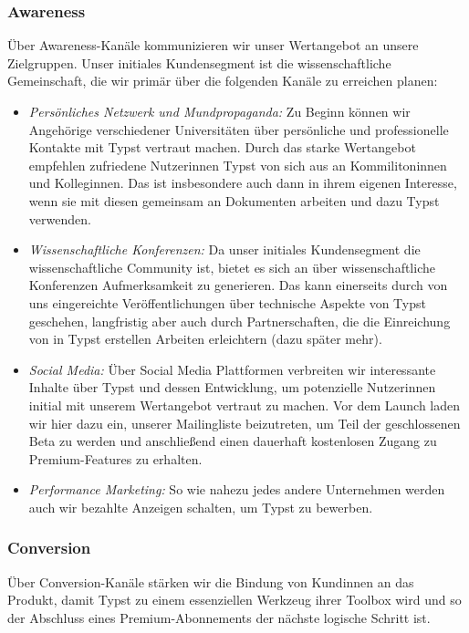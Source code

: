\documentclass[11pt, a4paper]{article}
\newcommand{\gender}{\raisebox{-.25em}{*}}
\renewcommand{\glossary} {\marginsymbol{$\hookrightarrow$}}
\newcommand{\marginsymbol}[1] {\protect\marginsymbolhelper{#1}}
\newcommand{\marginsymbolhelper}[1] {\tabto*{-1cm}\makebox[0cm]{#1}\tabto*{\TabPrevPos}}
\begin{document}
\subsubsection*{Awareness}

Über Awareness-Kanäle kommunizieren wir unser Wertangebot an unsere Zielgruppen. Unser initiales Kundensegment ist die wissenschaftliche Gemeinschaft, die wir primär über die folgenden Kanäle zu erreichen planen:

\begin{itemize}
    \item \emph{Persönliches Netzwerk und Mundpropaganda:} Zu Beginn können wir Angehörige verschiedener Universitäten über persönliche und professionelle Kontakte mit Typst vertraut machen. Durch das starke Wertangebot empfehlen zufriedene Nutzer\gender{}innen Typst von sich aus an Kommiliton\gender{}innen und Kolleg\gender{}innen. Das ist insbesondere auch dann in ihrem eigenen Interesse, wenn sie mit diesen gemeinsam an Dokumenten arbeiten und dazu Typst verwenden.
    \item \emph{Wissenschaftliche Konferenzen:} Da unser initiales Kundensegment die wissenschaftliche Community ist, bietet es sich an über wissenschaftliche Konferenzen Aufmerksamkeit zu generieren. Das kann einerseits durch von uns eingereichte Veröffentlichungen über technische Aspekte von Typst geschehen, langfristig aber auch durch Partnerschaften, die die Einreichung von in Typst erstellen Arbeiten erleichtern (dazu später mehr).
    \item \emph{Social Media:} Über Social Media Plattformen verbreiten wir interessante Inhalte über Typst und dessen Entwicklung, um potenzielle Nutzer\gender{}innen initial mit unserem Wertangebot vertraut zu machen. Vor dem Launch laden wir hier dazu ein, unserer Mailingliste beizutreten, um Teil der geschlossenen Beta zu werden und anschließend einen dauerhaft kostenlosen Zugang zu Premium-Features zu erhalten.
    \item \emph{Performance Marketing:} So wie nahezu jedes andere Unternehmen werden auch wir bezahlte Anzeigen schalten, um Typst zu bewerben. 
\end{itemize}

\subsubsection*{Conversion}


Über \glossary Conversion-Kanäle stärken wir die Bindung von Kund\gender{}innen an das Produkt, damit Typst zu einem essenziellen Werkzeug ihrer Toolbox wird und so der Abschluss eines Premium-Abonnements der nächste logische Schritt ist. 
\end{document}
